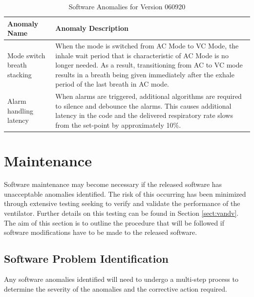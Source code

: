 \documentclass[]{article}
\begin{document}
\begin{center}
	\begin{table}[h]
		\caption{Software Anomalies for Version 060920}
		\label{tab:sw_anom}
		\begin{tabular}{ |p{4cm}|p{10cm}|}
			
			\hline
			\textbf{Anomaly Name} & \textbf{Anomaly Description}  \\ \hline
			Mode switch breath stacking & When the mode is switched from AC Mode to VC Mode, the inhale wait period that is characteristic of AC Mode is no longer needed.  As a result, transitioning from AC to VC mode results in a breath being given immediately after the exhale period of the last breath in AC mode.\\ \hline 
			Alarm handling latency & When alarms are triggered, additional algorithms are required to silence and debounce the alarms.  This causes additional latency in the code and the delivered respiratory rate slows from the set-point by approximately 10\%.\\ \hline
		
			
		\end{tabular}
	\end{table}	
\end{center}






\clearpage


\section{Maintenance}
\label{sect:maintenance}

Software maintenance may become necessary if the released software has unacceptable anomalies identified.  The risk of this occurring has been minimized through extensive testing seeking to verify and validate the performance of the ventilator.  Further details on this testing can be found in Section \ref{sect:vandv}.  The aim of this section is to outline the procedure that will be followed if software modifications have to be made to the released software.

\subsection{Software Problem Identification}
Any software anomalies identified will need to undergo a multi-step process to determine the severity of the anomalies and the corrective action required.
\end{document}
